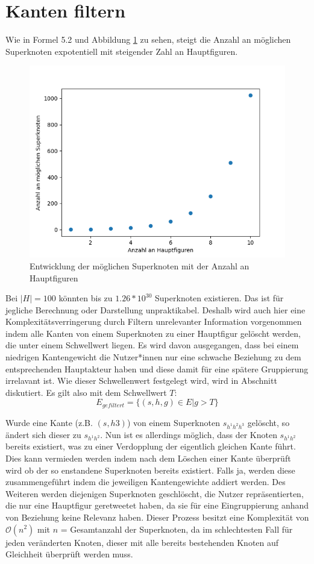 \section{Kanten filtern}
\label{sec:kanten-filtern}
Wie in Formel 5.2 und Abbildung \ref{fig:superknotenentwicklung} zu sehen, steigt die Anzahl an möglichen Superknoten expotentiell mit steigender Zahl an Hauptfiguren.
\begin{figure}[h]
	\centering
	\includegraphics[width=0.7\linewidth]{images/Superknotenentwicklung}
	\caption[]{Entwicklung der möglichen Superknoten mit der Anzahl an Hauptfiguren}
	\label{fig:superknotenentwicklung}
\end{figure}
Bei $|H| = 100$ könnten bis zu $1.26*10^{30}$ Superknoten existieren. Das ist für jegliche Berechnung oder Darstellung unpraktikabel.
Deshalb wird auch hier eine Komplexitätsverringerung durch Filtern unrelevanter Information vorgenommen indem alle Kanten von einem Superknoten zu einer Hauptfigur gelöscht werden, die unter einem Schwellwert liegen. 
Es wird davon ausgegangen, dass  bei einem niedrigen Kantengewicht die Nutzer*innen nur eine schwache Beziehung zu dem entsprechenden Hauptakteur haben und diese damit für eine spätere Gruppierung irrelavant ist. 
Wie dieser Schwellenwert festgelegt wird, wird in Abschnitt diskutiert. 
Es gilt also mit dem Schwellwert $T$: \begin{equation}
	E_{gefiltert} = \{(s,h,g)\in E|g>T\}
\end{equation}

Wurde eine Kante (z.B. $(s,h3)$) von einem Superknoten $s_{h^1h^2h^3}$ gelöscht, so ändert sich dieser zu $s_{h^1h^2}$. Nun ist es allerdings möglich, dass der Knoten $s_{h^1h^2}$ bereits existiert, was zu einer Verdopplung der eigentlich gleichen Kante führt. Dies kann vermieden werden indem nach dem Löschen einer Kante überprüft wird ob der so enstandene Superknoten bereits existiert. Falls ja, werden diese zusammengeführt indem die jeweiligen Kantengewichte addiert werden.
Des Weiteren werden diejenigen Superknoten geschlöscht, die Nutzer repräsentierten, die nur eine Hauptfigur \gls{geretweetet} haben, da sie für eine Eingruppierung anhand von Beziehung keine Relevanz haben.
Dieser Prozess besitzt eine Komplexität von $\mathcal{O}(n^2)$ mit $n$ = Gesamtanzahl der Superknoten, da im schlechtesten Fall für jeden veränderten Knoten, dieser mit alle bereits bestehenden Knoten auf Gleichheit überprüft werden muss.
